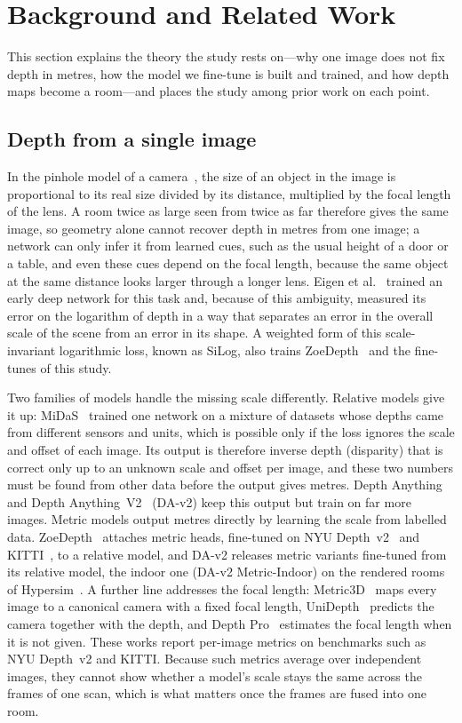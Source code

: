 \section{Background and Related Work}\label{sec:related}

This section explains the theory the study rests on---why one image does not fix depth in metres, how the model we
fine-tune is built and trained, and how depth maps become a room---and places the study among prior work on each point.

\subsection{Depth from a single image}
In the pinhole model of a camera~\cite{hartley}, the size of an object in the image is proportional to its real size
divided by its distance, multiplied by the focal length of the lens. A room twice as large seen from twice as far
therefore gives the same image, so geometry alone cannot recover depth in metres from one image; a network can only
infer it from learned cues, such as the usual height of a door or a table, and even these cues depend on the focal
length, because the same object at the same distance looks larger through a longer lens. Eigen et al.~\cite{eigen14}
trained an early deep network for this task and, because of this ambiguity, measured its error on the logarithm of
depth in a way that separates an error in the overall scale of the scene from an error in its shape. A weighted form
of this scale-invariant logarithmic loss, known as SiLog, also trains ZoeDepth~\cite{zoedepth} and the fine-tunes of
this study.

Two families of models handle the missing scale differently. Relative models give it up: MiDaS~\cite{midas} trained one
network on a mixture of datasets whose depths came from different sensors and units, which is possible only if the loss
ignores the scale and offset of each image. Its output is therefore inverse depth (disparity) that is correct only up
to an unknown scale and offset per image, and these two numbers must be found from other data before the output gives
metres. Depth Anything~\cite{da1} and Depth Anything~V2~\cite{da2} (\mbox{DA-v2}) keep this output but train on far more
images. Metric models output metres directly by learning the scale from labelled data. ZoeDepth~\cite{zoedepth} attaches
metric heads, fine-tuned on NYU Depth~v2~\cite{nyuv2} and KITTI~\cite{kitti}, to a relative model, and \mbox{DA-v2} releases
metric variants fine-tuned from its relative model, the indoor one (\mbox{DA-v2} Metric-Indoor) on the rendered rooms of
Hypersim~\cite{hypersim}. A further line addresses the focal length: Metric3D~\cite{metric3d} maps every image to a
canonical camera with a fixed focal length, UniDepth~\cite{unidepth} predicts the camera together with the depth, and
Depth Pro~\cite{depthpro} estimates the focal length when it is not given. These works report per-image metrics on
benchmarks such as NYU Depth~v2 and KITTI. Because such metrics average over independent images, they cannot show
whether a model's scale stays the same across the frames of one scan, which is what matters once the frames are fused
into one room.

